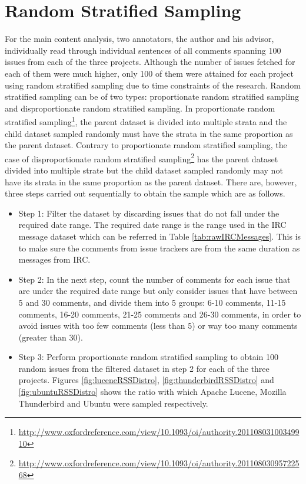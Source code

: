 \documentclass[a4paper,12pt,twoside]{report}
\begin{document}
\section{Random Stratified Sampling}
For the main content analysis, two annotators, the author and his advisor, individually read through individual sentences of all comments spanning 100 issues from each of the three projects. Although the number of issues fetched for each of them were much higher, only 100 of them were attained for each project using random stratified sampling due to time constraints of the research. Random stratified sampling can be of two types: proportionate random stratified sampling and disproportionate random stratified sampling. In proportionate random stratified sampling\footnote{\url{http://www.oxfordreference.com/view/10.1093/oi/authority.20110803100349910}}, the parent dataset is divided into multiple strata and the child dataset sampled randomly must have the strata in the same proportion as the parent dataset. Contrary to proportionate random stratified sampling, the case of disproportionate random stratified sampling\footnote{\url{http://www.oxfordreference.com/view/10.1093/oi/authority.20110803095722568}} has the parent dataset divided into multiple strate but the child dataset sampled randomly may not have its strata in the same proportion as the parent dataset. There are, however, three steps carried out sequentially to obtain the sample which are as follows.

\begin{itemize}
\item {Step 1:} Filter the dataset by discarding issues that do not fall under the required date range. The required date range is the range used in the IRC message dataset which can be referred in Table \ref{tab:rawIRCMessages}. This is to make sure the comments from issue trackers are from the same duration as messages from IRC. 
\item {Step 2:} In the next step, count the number of comments for each issue that are under the required date range but only consider issues that have between 5 and 30 comments, and divide them into 5 groups: 6-10 comments, 11-15 comments, 16-20 comments, 21-25 comments and 26-30 comments, in order to avoid issues with too few comments (less than 5) or way too many comments (greater than 30). 
\item {Step 3:} Perform proportionate random stratified sampling to obtain 100 random issues from the filtered dataset in step 2 for each of the three projects. Figures \ref{fig:luceneRSSDistro}, \ref{fig:thunderbirdRSSDistro} and \ref{fig:ubuntuRSSDistro} shows the ratio with which Apache Lucene, Mozilla Thunderbird and Ubuntu were sampled respectively. 
\end{itemize}
\end{document}
